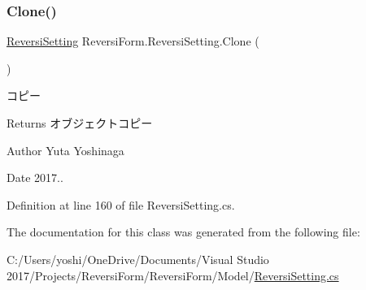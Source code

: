 \subsubsection{\texorpdfstring{Clone()}{Clone()}}
{\footnotesize\ttfamily \hyperlink{class_reversi_form_1_1_reversi_setting}{Reversi\+Setting} Reversi\+Form.\+Reversi\+Setting.\+Clone (\begin{DoxyParamCaption}{ }\end{DoxyParamCaption})}



コピー 

\begin{DoxyReturn}{Returns}
オブジェクトコピー 
\end{DoxyReturn}
\begin{DoxyAuthor}{Author}
Yuta Yoshinaga 
\end{DoxyAuthor}
\begin{DoxyDate}{Date}
2017.. 
\end{DoxyDate}


Definition at line 160 of file Reversi\+Setting.\+cs.



The documentation for this class was generated from the following file\+:\begin{DoxyCompactItemize}
\item 
C\+:/\+Users/yoshi/\+One\+Drive/\+Documents/\+Visual Studio 2017/\+Projects/\+Reversi\+Form/\+Reversi\+Form/\+Model/\hyperlink{_reversi_setting_8cs}{Reversi\+Setting.\+cs}\end{DoxyCompactItemize}
